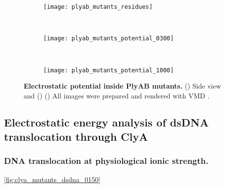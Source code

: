 \begin{figure*}[t]
  \centering
  \medskip

  \begin{subfigure}[t]{120mm}
    \centering
    \caption{}\vspace{-5mm}\hspace{1.5mm}\label{fig:plyab_mutants_residues}
    \texttt{[image: plyab\_mutants\_residues]}
  \end{subfigure}
  \\ \vspace{-2mm}
  \begin{subfigure}[t]{120mm}
    \centering
    \caption{}\vspace{-2.5mm}\hspace{1.5mm}\label{fig:plyab_mutants_potential_0300}
    \texttt{[image: plyab\_mutants\_potential\_0300]}
  \end{subfigure}
  \\ \vspace{0mm}
  \begin{subfigure}[t]{120mm}
    \centering
    \caption{}\vspace{-2.5mm}\hspace{1.5mm}\label{fig:plyab_mutants_potential_2500}
    \texttt{[image: plyab\_mutants\_potential\_1000]}
  \end{subfigure}

\caption[Electrostatic potential inside PlyAB mutants.]{%
  \textbf{Electrostatic potential inside PlyAB mutants.}
  ()
  Side view and
  ()
  ()
  All images were prepared and rendered with VMD \cite{Humphrey-1996,Stone-1998}.
  }\label{fig:plyab_mutants}
\end{figure*}


\subsection{Electrostatic energy analysis of dsDNA translocation through ClyA}
%

%
\subsubsection{DNA translocation at physiological ionic strength.}
%
\cref{fig:clya_mutants_dsdna_0150}

